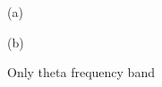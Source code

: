 \begin{figure}[h!]
\begin{minipage}[h]{0.49\linewidth}
 (a) \\
\end{minipage}
\hfill
\begin{minipage}[h]{0.5\linewidth}
 (b) \\
\end{minipage}
\caption{Only theta frequency band} 
\end{figure}

